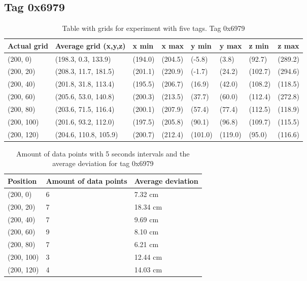 \subsection{Tag 0x6979}
\begin{table}[H]
    \centering
    \begin{tabular}{|l|l|l|l|l|l|l|l|}
        \hline
        Actual grid & Average grid (x,y,z)  & x min   & x max   & y min   & y max   & z min   & z max   \\ \hline
        (200, 0)    & (198.3, 0.3, 133.9)   & (194.0) & (204.5) & (-5.8)  & (3.8)   & (92.7)  & (289.2) \\ \hline
        (200, 20)   & (208.3, 11.7, 181.5)  & (201.1) & (220.9) & (-1.7)  & (24.2)  & (102.7) & (294.6) \\ \hline
        (200, 40)   & (201.8, 31.8, 113.4)  & (195.5) & (206.7) & (16.9)  & (42.0)  & (108.2) & (118.5) \\ \hline
        (200, 60)   & (205.6, 53.0, 140.8)  & (200.3) & (213.5) & (37.7)  & (60.0)  & (112.4) & (272.8) \\ \hline
        (200, 80)   & (203.6, 71.5, 116.4)  & (200.1) & (207.9) & (57.4)  & (77.4)  & (112.5) & (118.9) \\ \hline
        (200, 100)  & (201.6, 93.2, 112.0)  & (197.5) & (205.8) & (90.1)  & (96.8)  & (109.7) & (115.5) \\ \hline
        (200, 120)  & (204.6, 110.8, 105.9) & (200.7) & (212.4) & (101.0) & (119.0) & (95.0)  & (116.6) \\ \hline
    \end{tabular}
    \caption{Table with grids for experiment with five tags. Tag 0x6979}
\end{table}

\begin{table}[H]
    \centering
    \begin{tabular}{|l|l|l|}
        \hline
        Position   & Amount of data points & Average deviation \\ \hline
        (200, 0)   & 6                     & 7.32 cm           \\ \hline
        (200, 20)  & 7                     & 18.34 cm          \\ \hline
        (200, 40)  & 7                     & 9.69 cm           \\ \hline
        (200, 60)  & 9                     & 8.10 cm           \\ \hline
        (200, 80)  & 7                     & 6.21 cm           \\ \hline
        (200, 100) & 3                     & 12.44 cm          \\ \hline
        (200, 120) & 4                     & 14.03 cm          \\ \hline
    \end{tabular}
    \caption{Amount of data points with 5 seconds intervals and the average deviation for tag 0x6979}
\end{table}

